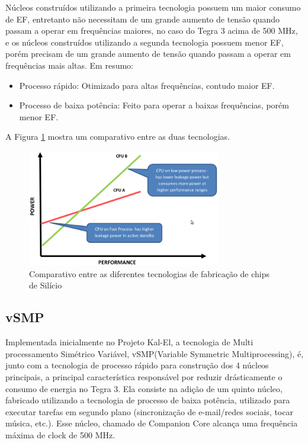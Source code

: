 \documentclass[article]{IEEEtran}
\begin{document}
N\'ucleos constru\'idos utilizando a primeira tecnologia possuem um maior consumo de EF, entretanto n\~ao necessitam de um grande aumento de tens\~ao quando passam a operar em frequ\^encias maiores, no caso do Tegra 3 acima de 500 MHz, e os n\'ucleos constru\'idos utilizando a segunda tecnologia  possuem menor EF, por\'em precisam de um grande aumento de tens\~ao quando passam a operar em frequ\^encias mais altas. Em resumo:

\begin{itemize}
 \item Processo r\'apido: Otimizado para altas frequ\^encias, contudo maior EF.
 \item Processo de baixa pot\^encia: Feito para operar a baixas frequ\^encias, por\'em menor EF.
\end{itemize}  

A Figura \ref{fig:tecnologiaprocesso} mostra um comparativo entre as duas tecnologias.

\begin{figure}[ht]
  \centering
  \includegraphics[width=8.5cm]{./pictures/Tecnologiasdeprocesso.png}
  \caption{Comparativo entre as diferentes tecnologias de fabrica\c{c}\~ao de chips de Sil\'icio}
  \label{fig:tecnologiaprocesso}
\end{figure}

\subsection{vSMP}

Implementada inicialmente no Projeto Kal-El, a tecnologia de Multi processamento Sim\'etrico Vari\'avel, vSMP(Variable Symmetric Multiprocessing), \'e, junto com a tecnologia de processo r\'apido para constru\c{c}\~ao dos 4 n\'ucleos principais, a principal caracter\'istica respons\'avel por reduzir dr\'asticamente o consumo de energia no Tegra 3. Ela consiste na adi\c{c}\~ao de um quinto n\'ucleo, fabricado utilizando a tecnologia de processo de baixa pot\^encia, utilizado para executar tarefas em segundo plano (sincroniza\c{c}\~ao de e-mail/redes sociais, tocar m\'usica, etc.). Esse n\'ucleo, chamado de Companion Core alcan\c{c}a uma frequ\^encia m\'axima de clock de 500 MHz.
\end{document}
